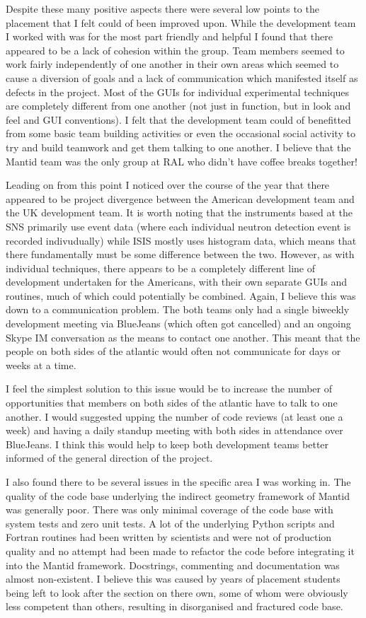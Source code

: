 \documentclass[paper=a4, fontsize=11pt]{scrartcl}	%
\numberwithin{equation}{section}															%
\numberwithin{figure}{section}																%
\numberwithin{table}{section}
\begin{document}
Despite these many positive aspects there were several low points to
the placement that I felt could of been improved upon. While the
development team I worked with was for the most part friendly and
helpful I found that there appeared to be a lack of cohesion within the
group. Team members seemed to work fairly independently of one another
in their own areas which seemed to cause a diversion of goals and a lack
of communication which manifested itself as defects in the project. Most
of the GUIs for individual experimental techniques are completely
different from one another (not just in function, but in look and feel
and GUI conventions). I felt that the development team could of
benefitted from some basic team building activities or even the
occasional social activity to try and build teamwork and get them
talking to one another. I believe that the Mantid team was the only
group at RAL who didn't have coffee breaks together!

Leading on from this point I noticed over the course of the year that
there appeared to be project divergence between the American development
team and the UK development team. It is worth noting that the
instruments based at the SNS primarily use event data (where each
individual neutron detection event is recorded indivudually) while ISIS
mostly uses histogram data, which means that there fundamentally must be
some difference between the two. However, as with individual techniques,
there appears to be a completely different line of development
undertaken for the Americans, with their own separate GUIs and routines,
much of which could potentially be combined. Again, I believe this was
down to a communication problem. The both teams only had a single
biweekly development meeting via BlueJeans (which often got cancelled)
and an ongoing Skype IM conversation as the means to contact one
another. This meant that the people on both sides of the atlantic would
often not communicate for days or weeks at a time.

I feel the simplest solution to this issue would be to increase the
number of opportunities that members on both sides of the atlantic have
to talk to one another. I would suggested upping the number of code
reviews (at least one a week) and having a daily standup meeting with
both sides in attendance over BlueJeans. I think this would help to keep
both development teams better informed of the general direction of the
project.

I also found there to be several issues in the specific area I was
working in. The quality of the code base underlying the indirect
geometry framework of Mantid was generally poor. There was only minimal
coverage of the code base with system tests and zero unit tests. A lot
of the underlying Python scripts and Fortran routines had been written
by scientists and were not of production quality and no attempt had been
made to refactor the code before integrating it into the Mantid
framework. Docstrings, commenting and documentation was almost
non-existent. I believe this was caused by years of placement students being left to look after the section on there own, some of whom were obviously less competent than others, resulting in disorganised and fractured code base.
\end{document}
